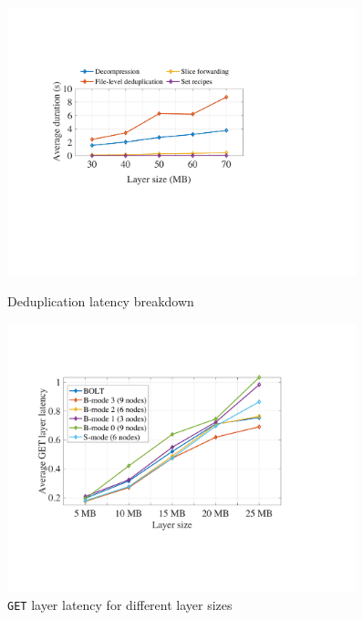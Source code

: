 \begin{figure}[t]
	\centering
	\begin{minipage}{0.3\textwidth}
		\centering
		\includegraphics[width=0.9\textwidth]{graphs/dedupbreakdown.pdf}
		\caption{Deduplication latency breakdown}
		\label{fig:eval-dedupbreakdown}
	\end{minipage}%
	\hspace{1mm}
	\begin{minipage}{0.3\textwidth}
		\centering
		\includegraphics[width=0.9\textwidth]{graphs/dalprimary.pdf}
		\caption{\texttt{GET} layer latency for different layer sizes}
		\label{fig:eval-dalprimary}
	\end{minipage}%
	\hspace{1mm}
	\begin{minipage}{0.3\textwidth}
		\centering

\end{minipage}
\end{figure}
